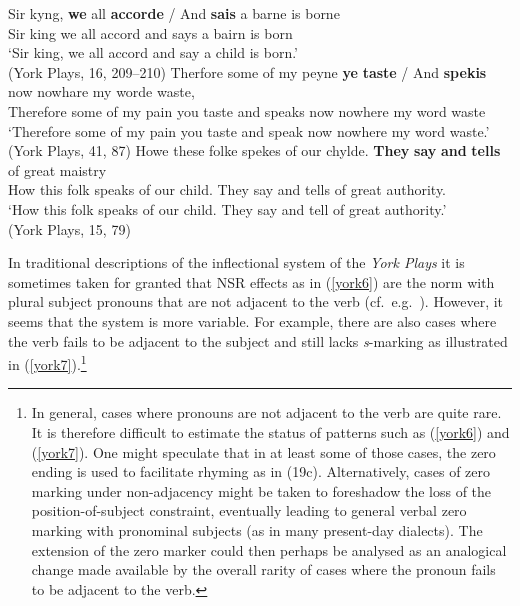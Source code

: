 \documentclass[output=paper]{langsci/langscibook}
\begin{document}
\ea
\label{york6}
\ea \gll Sir kyng, \textbf{we} all \textbf{accorde} / And \textbf{sais} a barne is borne \\
Sir king we all accord {} and says a bairn is born\\
\glt `Sir king, we all accord and say a child is born.'\\
(York Plays, 16, 209--210)
\ex \gll Therfore some of my peyne \textbf{ye} \textbf{taste} / And \textbf{spekis} now nowhare my worde waste, \\
Therefore some of my pain you\tief{[2pl]} taste {} and speaks now nowhere my word waste\\
\glt `Therefore some of my pain you taste and speak now nowhere my word waste.'\\
(York Plays, 41, 87)
\ex
\gll Howe these folke spekes of our chylde. \textbf{They} \textbf{say} \textbf{and} \textbf{tells} of great maistry \\
How this folk speaks of our child. They say and tells of great authority. \\
\glt `How this folk speaks of our child. They say and tell of great authority.'\\
(York Plays, 15, 79)
\z
\z

In traditional descriptions of the inflectional system of the \emph{York Plays}
it is sometimes taken for granted that \gls{NSR}
effects as in (\ref{york6}) are the norm with plural subject pronouns that are
not adjacent to the verb (cf.\ e.g.\ \citealt[272]{BurrowTurville-Petre:2005}).
However, it seems that the  system is more variable. For
example, there are also cases where the verb fails to be adjacent to the
subject and still lacks \emph{s}-marking as illustrated in
(\ref{york7}).\footnote{In general, cases where pronouns are not adjacent to
the verb are quite rare. It is therefore difficult to estimate the status of
patterns such as (\ref{york6}) and (\ref{york7}). One might speculate that in
at least some of those cases, the zero ending is used to facilitate rhyming as
in (19c). Alternatively, cases of zero marking under non-adjacency might be
taken to foreshadow the loss of the position-of-subject constraint, eventually
leading to general verbal zero marking with pronominal subjects (as in many
present-day dialects). The extension of the zero marker could then perhaps be
analysed as an analogical change made available by the overall rarity of cases
where the pronoun fails to be adjacent to the verb.}
\end{document}
